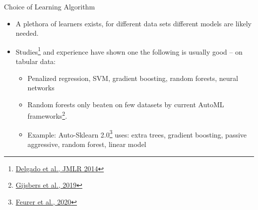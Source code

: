 \begin{frame}{Choice of Learning Algorithm}
  \begin{itemize}
    \item A plethora of learners exists, for different data sets different models
        are likely needed.
    \item Studies\footnote{\href{https://dl.acm.org/doi/10.5555/2627435.2697065}{Delgado et al., JMLR 2014}} and experience have shown one the following 
        is usually good -- on tabular data:
    \begin{itemize}
      \item Penalized regression, SVM, gradient boosting, random forests, neural networks
      \item Random forests only beaten on few datasets by current AutoML frameworks\footnote{\href{https://arxiv.org/abs/1907.00909}{Gijsbers et al., 2019}}.
      \item Example: Auto-Sklearn 2.0\footnote{\href{https://arxiv.org/abs/2007.04074}{Feurer et al., 2020}} uses: extra trees, gradient boosting, passive aggressive, random forest, linear model
    \end{itemize}
  \end{itemize}
\end{frame}

